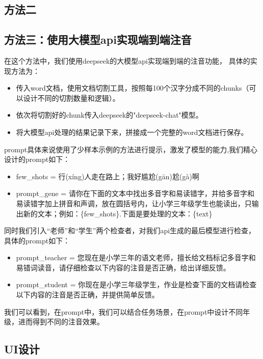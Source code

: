 \documentclass[12pt,hyperref,a4paper,UTF8]{ctexart}
\begin{document}
\subsection{方法二}
\subsection{方法三：使用大模型api实现端到端注音}
在这个方法中，我们使用deepseek的大模型api实现端到端的注音功能，
具体的实现方法为：
\begin{itemize}
    \item 传入word文档，使用文档切割工具，按照每100个汉字分成不同的chunks（可以设计不同的切割数量和逻辑）。
    \item 依次将切割好的chunk传入deepseek的"deepseek-chat"模型。
    \item 将大模型api处理的结果记录下来，拼接成一个完整的word文档进行保存。
\end{itemize}
prompt具体来说使用了少样本示例的方法进行提示，激发了模型的能力,我们精心设计的prompt如下：
\begin{itemize}
    \item few\_shots = 行(xíng)人走在路上；我好尴尬(gān)尬(gà)啊
    \item prompt\_gene = 请你在下面的文本中找出多音字和易读错字，并给多音字和易读错字加上拼音和声调，放在圆括号内，让小学三年级学生也能读出，只输出新的文本；例如：\{few\_shots\}.下面是要处理的文本：\{text\}
\end{itemize}
同时我们引入“老师”和“学生”两个检查者，对我们api生成的最后模型进行检查，具体的prompt如下：
\begin{itemize}
    \item prompt\_teacher = 您现在是小学三年的语文老师，擅长给文档标记多音字和易错词读音，请仔细检查以下内容的注音是否正确，给出详细反馈。
    \item prompt\_student = 你现在是小学三年级学生，作业是检查下面的文档请检查以下内容的注音是否正确，并提供简单反馈。
\end{itemize}
我们可以看到，在prompt中，我们可以结合任务场景，在prompt中设计不同年级，进而得到不同的注音效果。
\subsection{UI设计}
\end{document}
